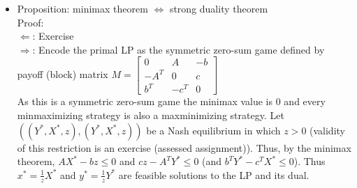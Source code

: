 \documentclass[20pt,a4paper,landscape]{extarticle}
\begin{document}
\begin{flushleft}
\begin{itemize}
\begin{lpformulation}
\end{lpformulation}
\clearpage
\item Proposition: minimax theorem $\Leftrightarrow$ strong duality theorem\\
Proof:\\
$\Leftarrow$: Exercise\\
$\Rightarrow$:
Encode the primal LP as the symmetric zero-sum game defined by payoff (block) matrix $M = \begin{bmatrix}
0 & A & -b \\
-A^T & 0 & c \\
b^T & -c^T & 0
\end{bmatrix}$\\
As this is a symmetric zero-sum game the minimax value is 0 and every minmaximizing strategy is also a maxminimizing strategy. Let $((Y^\ast, X^\ast, z), (Y^\ast, X^\ast, z))$ be a Nash equilibrium in which $z > 0$ (validity of this restriction is an exercise (assessed assignment)). Thus, by the minimax theorem, $AX^\ast - bz \leq 0$ and $cz - A^TY^\ast \leq 0$ (and $b^TY^\ast - c^TX^\ast \leq 0$). Thus $x^\ast = \frac{1}{z}X^\ast$ and $y^\ast = \frac{1}{z}Y^\ast$ are feasible solutions to the LP and its dual.
\end{itemize}
\clearpage

\end{flushleft}
\end{document}
